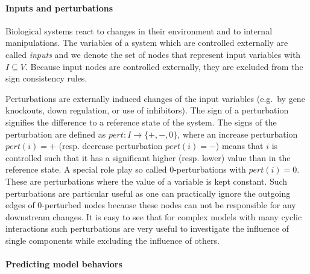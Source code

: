\paragraph*{\bf Inputs and perturbations}

Biological systems react to changes in their environment and to internal
manipulations.
The variables of a system which are controlled externally are called \emph{inputs}
and we denote the set of nodes that represent input variables with $I \subseteq V$.
Because input nodes are controlled externally, they are excluded from the sign
consistency rules.

Perturbations are externally induced changes of the input variables
(e.g.\ by gene knockouts, down regulation, or use of  inhibitors).
The sign of a perturbation signifies the difference to a reference state of the system.
The signs of the perturbation
are defined as $pert: I \rightarrow \{\plus, \minus, 0\}$,
where an increase perturbation $pert(i) = \plus$ (resp. decrease perturbation $pert(i)=\minus$) means that $i$
is controlled such that it has a significant higher (resp. lower) value than in
the reference state.
A special role play so called 0-perturbations with $pert(i)=0$.
These are perturbations where the value of a variable is kept constant.
Such perturbations are particular useful as one can practically ignore the
outgoing edges of 0-perturbed nodes because these nodes can not be responsible
for any downstream changes.
It is easy to see that for complex models with many cyclic interactions such
perturbations are very useful to investigate the influence of single components
while excluding the influence of others.



\paragraph*{\bf Predicting model behaviors}

